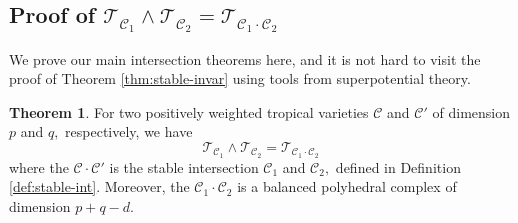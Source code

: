 \documentclass[11pt]{amsart}
\def\Log{{\rm Log}}
\theoremstyle{definition}
\newtheorem{theorem}{Theorem}[section]
\newtheorem{proposition}[theorem]{Proposition}
\newcommand{\R}{\mathbb{R}}
\newcommand{\lto}{\longrightarrow}
\newcommand{\cC}{\mathcal{C}}
\newcommand{\sT}{\mathscr{T}}
\newcommand{\supp}[1]{{\mathrm{supp}(#1)}}
\begin{document}
\subsection{Proof of $\sT_{\cC_1}\wedge \sT_{\cC_2} = \sT_{{\cC_1} \cdot {\cC_2}}$ }
We prove our main intersection theorems here, and it is not hard to visit the proof of Theorem \ref{thm:stable-invar} using tools from superpotential theory. 
\begin{theorem}\label{thm:main-int}
   For two positively weighted tropical varieties $\cC$ and $\cC'$ of dimension $p$ and $q,$ respectively, we have
    $$
     \sT_{\cC_1}\wedge \sT_{\cC_2} = \sT_{{\cC_1} \cdot {\cC_2}}
    $$
    where the $\cC \cdot \cC'$ is the stable intersection $\cC_1$ and $\cC_2,$ defined in Definition \ref{def:stable-int}. Moreover, the $\cC_1\cdot \cC_2$ is a balanced polyhedral complex of dimension $p+q -d. $
\end{theorem}






\end{document}
